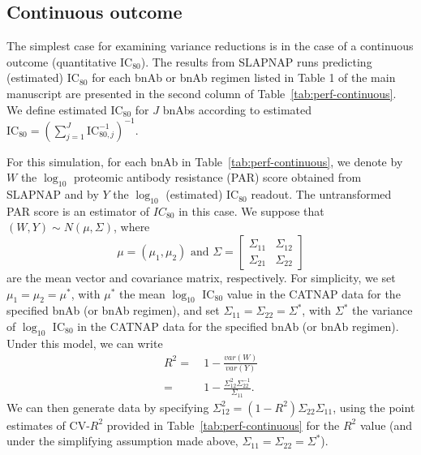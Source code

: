 \documentclass[10pt]{article}
\begin{document}
\subsection*{Continuous outcome}
The simplest case for examining variance reductions is in the case of a continuous outcome (quantitative IC$_{80}$). The results from SLAPNAP runs predicting (estimated) IC$_{80}$ for each bnAb or bnAb regimen listed in Table 1 of the main manuscript are presented in the second column of Table~\ref{tab:perf-continuous}. We define estimated IC$_{80}$ for $J$ bnAbs according to estimated $\text{IC}_{80} = \left(\sum_{j=1}^J \text{IC}_{80,j}^{-1}\right)^{-1}$.

For this simulation, for each bnAb in Table~\ref{tab:perf-continuous}, we denote by $W$ the $\log_{10}$ proteomic antibody resistance (PAR) score obtained from SLAPNAP and by $Y$ the $\log_{10}$ (estimated) IC$_{80}$ readout. The untransformed PAR score is an estimator of $IC_{80}$ in this case. We suppose that $(W,Y) \sim N(\mu, \Sigma)$, where
$$\mu = (\mu_1, \mu_2) \text{ and } \Sigma = \begin{bmatrix} \Sigma_{11} & \Sigma_{12} \\ \Sigma_{21} & \Sigma_{22} \end{bmatrix}$$ are the mean vector and covariance matrix, respectively. For simplicity, we set $\mu_1 = \mu_2 = \mu^*$, with $\mu^*$ the mean $\log_{10}$ IC$_{80}$ value in the CATNAP data \citep{yoon2015} for the specified bnAb (or bnAb regimen), and set $\Sigma_{11} = \Sigma_{22} = \Sigma^*$, with $\Sigma^*$ the variance of $\log_{10}$ IC$_{80}$ in the CATNAP data for the specified bnAb (or bnAb regimen). Under this model, we can write
\begin{align*}
    R^2 =& \ 1 - \frac{var(W)}{var(Y)} \\
    =& \ 1 - \frac{\Sigma_{12}^2\Sigma_{22}^{-1}}{\Sigma_{11}}.
\end{align*}
We can then generate data by specifying $\Sigma_{12}^2 = (1 - R^2)\Sigma_{22}\Sigma_{11}$, using the point estimates of CV-$R^2$ provided in Table~\ref{tab:perf-continuous} for the $R^2$ value (and under the simplifying assumption made above, $\Sigma_{11} = \Sigma_{22} = \Sigma^*$).
\end{document}

